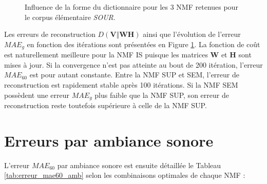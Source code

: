 \begin{figure}[h!]
\centering
{}%
\qquad
{}%
\caption{Influence de la forme du dictionnaire pour les 3 NMF retenues pour le corpus élémentaire \textit{SOUR}.}
\label{fig:evolution_mae}
\end{figure}

Les erreurs de reconstruction $D(\mathbf{V} \Vert \mathbf{WH})$ ainsi que l'évolution de l'erreur $MAE_g$ en fonction des itérations sont présentées en Figure \ref{fig:evolution_mae}. La fonction de coût est naturellement meilleure pour la NMF IS puisque les matrices $\mathbf{W}$ et $\mathbf{H}$ sont mises à jour. Si la convergence n'est pas atteinte au bout de 200 itération, l'erreur $MAE_{60}$ est pour autant constante. 
Entre la NMF SUP et SEM, l'erreur de reconstruction est rapidement stable après 100 itérations. Si la NMF SEM possèdent une erreur $MAE_g$ plus faible que la NMF SUP, son erreur de reconstruction reste toutefois supérieure à celle de la NMF SUP. 


\section{Erreurs par ambiance sonore}

L'erreur $MAE_{60}$ par ambiance sonore est ensuite détaillée le Tableau \ref{tab:erreur_mae60_amb} selon les combinaisons optimales de chaque NMF : 

